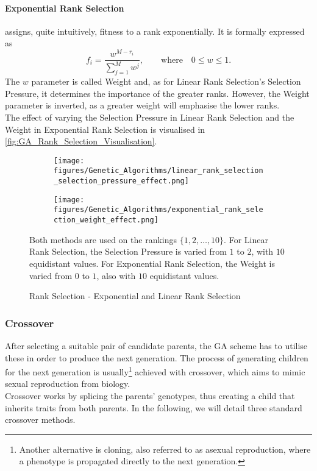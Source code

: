 \paragraph{Exponential Rank Selection} assigns, quite intuitively, fitness to a rank exponentially. It is formally expressed as
\begin{equation*}
    f_i = \frac{w^{M - r_i}}{\sum_{j = 1}^M w^{j}}, \qquad \text{where} \quad 0 \leq w \leq 1.
\end{equation*}
The $w$ parameter is called Weight and, as for Linear Rank Selection's Selection Pressure, it determines the importance of the greater ranks. However, the Weight parameter is inverted, as a greater weight will emphasise the lower ranks.
\\
The effect of varying the Selection Pressure in Linear Rank Selection and the Weight in Exponential Rank Selection is visualised in \autoref{fig:GA_Rank_Selection_Visualisation}.

\begin{figure}[H]
    \centering
    \begin{subfigure}[t]{0.8\textwidth}
        \centering
        \texttt{[image: figures/Genetic\_Algorithms/linear\_rank\_selection\_selection\_pressure\_effect.png]}
    \end{subfigure}
    \begin{subfigure}[b]{0.8\textwidth}
        \centering
        \texttt{[image: figures/Genetic\_Algorithms/exponential\_rank\_selection\_weight\_effect.png]}
    \end{subfigure}

    \caption{Rank Selection - Exponential and Linear Rank Selection}
    \small
    \raggedright
    Both methods are used on the rankings $\{1, 2, \hdots , 10\}$. For Linear Rank Selection, the Selection Pressure is varied from $1$ to $2$, with $10$ equidistant values. For Exponential Rank Selection, the Weight is varied from $0$ to $1$, also with $10$ equidistant values.
    \label{fig:GA_Rank_Selection_Visualisation}
\end{figure}

\subsubsection{Crossover}\label{subsubsec:Crossover}
After selecting a suitable pair of candidate parents, the GA scheme has to utilise these in order to produce the next generation. The process of generating children for the next generation is usually\footnote{Another alternative is cloning, also referred to as asexual reproduction, where a phenotype is propagated directly to the next generation.} achieved with crossover, which aims to mimic sexual reproduction from biology.
\\
Crossover works by splicing the parents' genotypes, thus creating a child that inherits traits from both parents. In the following, we will detail three standard crossover methods.

